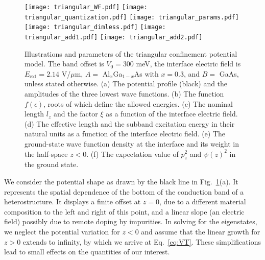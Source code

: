 \documentclass[aps,floatfix,twocolumn,showpacs,10pt,nofootinbib]{revtex4-1}
\begin{document}
\begin{figure}
\texttt{[image: triangular\_WF.pdf]}
\texttt{[image: triangular\_quantization.pdf]}
\texttt{[image: triangular\_params.pdf]}
\texttt{[image: triangular\_dimless.pdf]}
\texttt{[image: triangular\_add1.pdf]}
\texttt{[image: triangular\_add2.pdf]}
\caption{\label{fig:triangular}
Illustrations and parameters of the triangular confinement potential model. The band offset is $V_0=300$ meV, the interface electric field is $E_{\textrm{ext}}=2.14$ V/$\mu$m, $A=$ Al$_x$Ga$_{1-x}$As with $x=0.3$, and $B=$ GaAs, unless stated otherwise. (a) The potential profile (black) and the amplitudes of the three lowest wave functions. (b) The function $f(\epsilon)$, roots of which define the allowed energies. (c) The nominal length $l_z$ and the factor $\xi$ as a function of the interface electric field. (d) The effective length and the subband excitation energy in their natural units as a function of the interface electric field. (e) The ground-state wave function density at the interface and its weight in the half-space $z<0$. (f) The expectation value of $p_z^2$ and $\psi(z)^2$ in the ground state.}
\end{figure}

We consider the potential shape as drawn by the black line in Fig.~\ref{fig:triangular}(a). It represents the spatial dependence of the bottom of the conduction band of a heterostructure. It displays a finite offset at $z=0$, due to a different material composition to the left and right of this point, and a linear slope (an electric field) possibly due to remote doping by impurities. In solving for the eigenstates, we neglect the potential variation for $z<0$ and assume that the linear growth for $z>0$ extends to infinity, by which we arrive at Eq.~\eqref{eq:VT}. These simplifications lead to small effects on the quantities of our interest.
\end{document}

